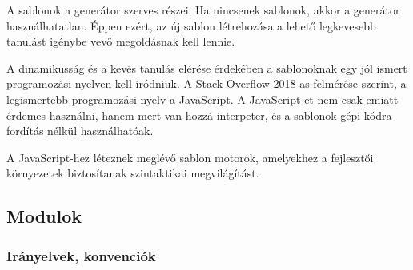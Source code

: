 \documentclass[a4paper,12pt,oneside]{report}
\begin{document}
\begin{justify}

	A sablonok a generátor szerves részei. Ha nincsenek sablonok, akkor a generátor használhatatlan. Éppen ezért, az új sablon létrehozása a lehető legkevesebb tanulást igénybe vevő megoldásnak kell lennie. 

	A dinamikusság és a kevés tanulás elérése érdekében a sablonoknak egy jól ismert programozási nyelven kell íródniuk. A Stack Overflow 2018-as felmérése szerint, a legismertebb programozási nyelv a JavaScript. \cite{website:most_known_language} A JavaScript-et nem csak emiatt érdemes használni, hanem mert van hozzá interpeter, és a sablonok gépi kódra fordítás nélkül használhatóak.

	A JavaScript-hez léteznek meglévő sablon motorok, amelyekhez a fejlesztői környezetek biztosítanak szintaktikai megvilágítást.


\end{justify}

\newpage
\subsection{Modulok}
\subsubsection{Irányelvek, konvenciók}
\end{document}
